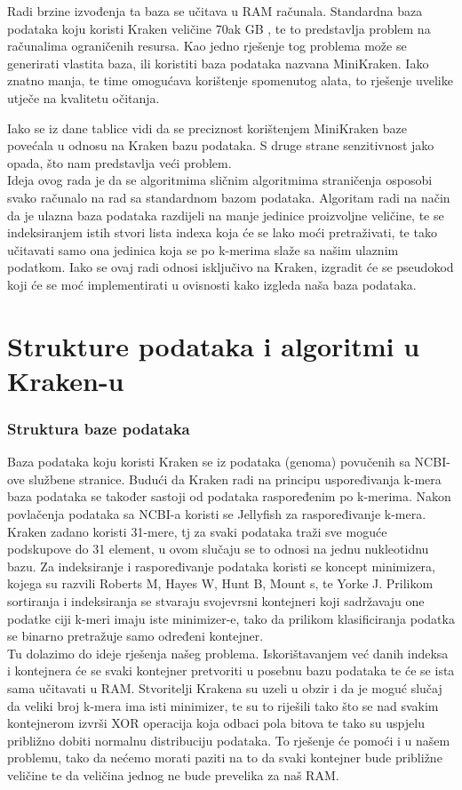 \documentclass[times, utf8, zavrsni]{fer}
\begin{document}
{Radi brzine izvođenja ta baza se učitava u RAM računala. Standardna baza podataka koju koristi Kraken veličine 70ak GB , te to predstavlja problem na računalima ograničenih resursa. Kao jedno rješenje tog problema može se generirati vlastita baza, ili koristiti baza podataka nazvana MiniKraken. Iako znatno manja, te time omogućava korištenje spomenutog alata, to rješenje uvelike utječe na kvalitetu očitanja.


Iako se iz dane tablice vidi da se preciznost korištenjem MiniKraken baze povećala u odnosu na Kraken bazu podataka. S druge strane senzitivnost jako opada, što nam predstavlja veći problem.\\Ideja ovog rada je da se algoritmima sličnim algoritmima straničenja osposobi svako računalo na rad sa standardnom bazom podataka. Algoritam radi na način da je ulazna baza podataka razdijeli na manje jedinice proizvoljne veličine, te se indeksiranjem istih stvori lista indexa koja će se lako moći pretraživati, te tako učitavati samo ona jedinica koja se po k-merima slaže sa našim ulaznim podatkom. Iako se ovaj radi odnosi isključivo na Kraken, izgradit će se pseudokod koji će se moć implementirati u ovisnosti kako izgleda naša baza podataka.
\chapter{Strukture podataka i algoritmi u Kraken-u}
\subsection{Struktura baze podataka}
Baza podataka koju koristi Kraken se iz podataka (genoma) povučenih sa NCBI-ove službene stranice. Budući da Kraken radi na principu uspoređivanja k-mera baza podataka se također sastoji od podataka raspoređenim po k-merima. Nakon povlačenja podataka sa NCBI-a koristi se Jellyfish za raspoređivanje k-mera. Kraken zadano koristi 31-mere, tj za svaki podataka traži sve moguće podskupove do 31 element, u ovom slučaju se to odnosi na jednu nukleotidnu bazu. Za indeksiranje i raspoređivanje podataka koristi se koncept minimizera, kojega su razvili Roberts M, Hayes W, Hunt B, Mount s, te Yorke J. Prilikom sortiranja i indeksiranja se stvaraju svojevrsni kontejneri koji sadržavaju one podatke ciji k-meri imaju iste minimizer-e, tako da prilikom klasificiranja podatka se binarno pretražuje samo određeni kontejner.\\ Tu dolazimo do ideje rješenja našeg problema. Iskorištavanjem već danih indeksa i kontejnera će se svaki kontejner pretvoriti u posebnu bazu podataka te će se ista sama učitavati u RAM. Stvoritelji Krakena su uzeli u obzir i da je moguć slučaj da veliki broj k-mera ima isti minimizer, te su to riješili tako što se nad svakim kontejnerom izvrši XOR operacija koja odbaci pola bitova te tako su uspjelu približno dobiti normalnu distribuciju podataka. To rješenje će pomoći i u našem problemu, tako da nećemo morati paziti na to da svaki kontejner bude približne veličine te da veličina jednog ne bude prevelika za naš RAM.

}
\end{document}
